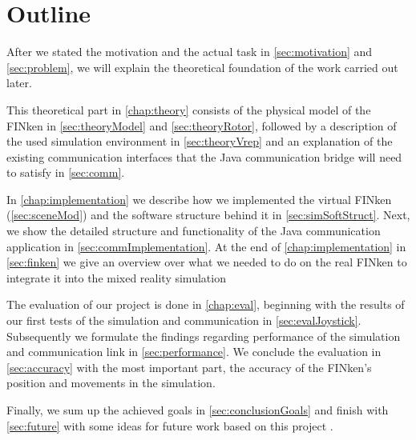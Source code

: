          
\section{Outline}
    After we stated the motivation and the actual task in \ref{sec:motivation} and \ref{sec:problem}, we will explain the theoretical foundation of the work carried out later.
    
    This theoretical part in \ref{chap:theory} consists of the physical model of the FINken in \ref{sec:theoryModel} and \ref{sec:theoryRotor}, followed by a description of the used simulation environment in \ref{sec:theoryVrep} and an explanation of the existing communication interfaces that the Java communication bridge will need to satisfy in \ref{sec:comm}.
    
    In \ref{chap:implementation} we describe how we implemented the virtual FINken (\ref{sec:sceneMod}) and the software structure behind it in \ref{sec:simSoftStruct}. 
    Next, we show the detailed structure and functionality of the Java communication application in \ref{sec:commImplementation}.
    At the end of \ref{chap:implementation} in \ref{sec:finken} we give an overview over what we needed to do on the real FINken to integrate it into the mixed reality simulation
    
    The evaluation of our project is done in \ref{chap:eval}, beginning with the results of our first tests of the simulation and communication in \ref{sec:evalJoystick}.
    Subsequently we formulate the findings regarding performance of the simulation and communication link in \ref{sec:performance}.
    We conclude the evaluation in \ref{sec:accuracy} with the most important part, the accuracy of the FINken's position and movements in the simulation.
    
    Finally, we sum up the achieved goals in \ref{sec:conclusionGoals} and finish with \ref{sec:future} with some ideas for future work based on this project . 
    
